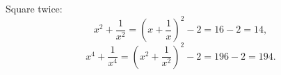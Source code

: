 Square twice:
\[
x^2+\dfrac{1}{x^2}=\left(x+\dfrac{1}{x}\right)^2-2=16-2=14,
\]
\[
x^4+\dfrac{1}{x^4}=\left(x^2+\dfrac{1}{x^2}\right)^2-2=196-2=\boxed{194}.
\]

